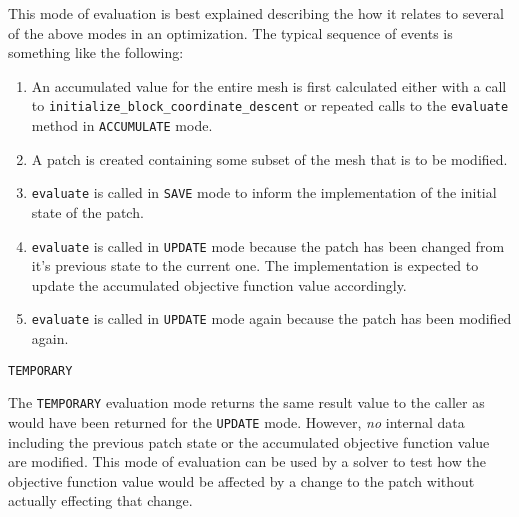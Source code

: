 \documentclass{article}
\begin{document}
\begin{description}
This mode of evaluation is best explained describing the how it relates to several of the above modes in an optimization.  The typical sequence of events is something like the following:
\begin{enumerate}

\item An accumulated value for the entire mesh is first calculated either with a call to \texttt{initialize\_block\_coordinate\_descent} or repeated calls to the \texttt{evaluate} method in \texttt{ACCUMULATE} mode.

\item A patch is created containing some subset of the mesh that is to be modified.

\item \texttt{evaluate} is called in \texttt{SAVE} mode to inform the implementation of the initial state of the patch.

\item \texttt{evaluate} is called in \texttt{UPDATE} mode because the patch has been changed from it's previous state to the current one.  The implementation is expected to update the accumulated objective function value accordingly.

\item \texttt{evaluate} is called in \texttt{UPDATE} mode again because the patch has been modified again.

\end{enumerate}

\item{\texttt{TEMPORARY}}

The \texttt{TEMPORARY} evaluation mode returns the same result value to the caller as would have been returned for the \texttt{UPDATE} mode.  However, \emph{no} internal data including the previous patch state or the accumulated objective function value are modified.  This mode of evaluation can be used by a solver to test how the objective function value would be affected by a change to the patch without actually effecting that change.

\end{description}
\end{document}
